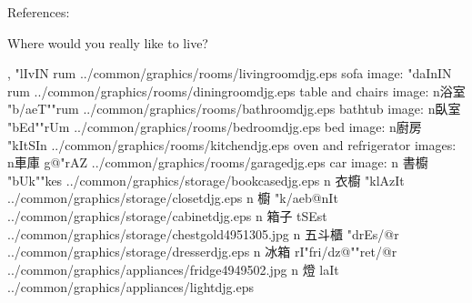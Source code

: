 {\scriptsize
References:\\
\begin{enume}
  \item {}
  \item {}
  \item {}
\end{enume}
}

\newpage
\bannerWS
\cntreset
Where would you really like to live?

\begin{tGe}{14}{, }
     {}{"lIvIN rum}          {../common/graphics/rooms/livingroomdjg.eps} {sofa image: }%
     {}{"daInIN rum}         {../common/graphics/rooms/diningroomdjg.eps} {table and chairs image: }%
     {n}{浴室}   {}{"b{/ae}T""rum}        {../common/graphics/rooms/bathroomdjg.eps}   {bathtub image: }%
      {n}{臥室}   {}{"bEd""rUm}   {../common/graphics/rooms/bedroomdjg.eps}    {bed image: }%
      {n}{廚房}   {}{"kItSIn}             {../common/graphics/rooms/kitchendjg.eps}    {oven and refrigerator images: }%
       {n}{車庫}   {}{g@"rAZ}              {../common/graphics/rooms/garagedjg.eps}  {car image: }%
        {n} {書櫥}    {}{"bUk""kes}         {../common/graphics/storage/bookcasedjg.eps}        {}%
          {n} {衣櫥}    {}{"klAzIt}               {../common/graphics/storage/closetdjg.eps}          {}%
         {n} {櫥}      {}{"k{/ae}b@nIt}           {../common/graphics/storage/cabinetdjg.eps}         {}%
           {n} {箱子}    {}{tSEst}                 {../common/graphics/storage/chestgold4951305.jpg}   {}%
         {n} {五斗櫃}  {}{"drEs{/@r}}            {../common/graphics/storage/dresserdjg.eps}         {}%
    {n} {冰箱}    {}{rI"fri{/dz}@""ret{/@r}}   {../common/graphics/appliances/fridge4949502.jpg}   {}%
       {n} {燈}      {}{laIt}              {../common/graphics/appliances/lightdjg.eps}        {}%

\end{tGe}
